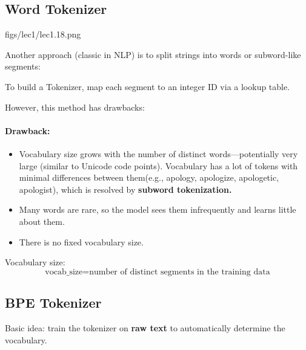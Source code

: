 \subsection{Word Tokenizer}

\MarginImageWithNote
  {figs/lec1/lec1.18.png}
  {}

  
Another approach (classic in NLP) is to split strings into words or subword-like segments:

To build a Tokenizer, map each segment to an integer ID via a lookup table.  

However, this method has drawbacks:

\paragraph{Drawback:}

\begin{itemize}[leftmargin=*]
  \item Vocabulary size grows with the number of distinct words—potentially very large (similar to Unicode code points). Vocabulary has a lot of tokens with minimal differences between them(e.g., apology, apologize, apologetic, apologist), which is resolved by {\color{dblue} \textbf{subword tokenization.}}
  \item Many words are rare, so the model sees them infrequently and learns little about them.
  \item There is no fixed vocabulary size.
\end{itemize}



\noindent Vocabulary size:
\[
  \text{vocab\_size}
  = \text{number of distinct segments in the training data}
\]


\subsection{BPE Tokenizer}

Basic idea: train the tokenizer on \textbf{raw text} to automatically determine the vocabulary.


